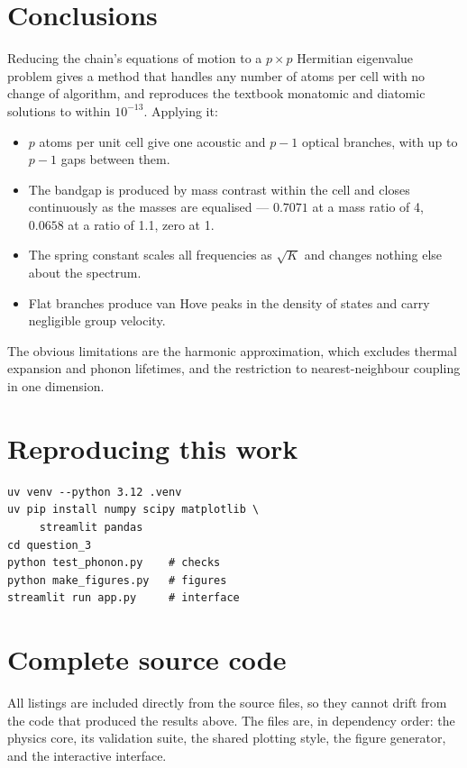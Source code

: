 \documentclass[aps,prb,reprint,nofootinbib]{revtex4-2}
\begin{document}
\section{Conclusions}

Reducing the chain's equations of motion to a $p \times p$ Hermitian eigenvalue problem gives a
method that handles any number of atoms per cell with no change of algorithm, and reproduces the
textbook monatomic and diatomic solutions to within $10^{-13}$. Applying it:

\begin{itemize}
  \item $p$ atoms per unit cell give one acoustic and $p-1$ optical branches, with up to $p-1$
        gaps between them.
  \item The bandgap is produced by mass contrast within the cell and closes continuously as the
        masses are equalised --- $0.7071$ at a mass ratio of 4, $0.0658$ at a ratio of 1.1, zero
        at 1.
  \item The spring constant scales all frequencies as $\sqrt{K}$ and changes nothing else about
        the spectrum.
  \item Flat branches produce van Hove peaks in the density of states and carry negligible group
        velocity.
\end{itemize}

The obvious limitations are the harmonic approximation, which excludes thermal expansion and
phonon lifetimes, and the restriction to nearest-neighbour coupling in one dimension.

\section*{Reproducing this work}

\begin{verbatim}
uv venv --python 3.12 .venv
uv pip install numpy scipy matplotlib \
     streamlit pandas
cd question_3
python test_phonon.py    # checks
python make_figures.py   # figures
streamlit run app.py     # interface
\end{verbatim}

\onecolumngrid
\appendix

\section{Complete source code}

All listings are included directly from the source files, so they cannot drift from the code that
produced the results above. The files are, in dependency order: the physics core, its validation
suite, the shared plotting style, the figure generator, and the interactive interface.
\end{document}
